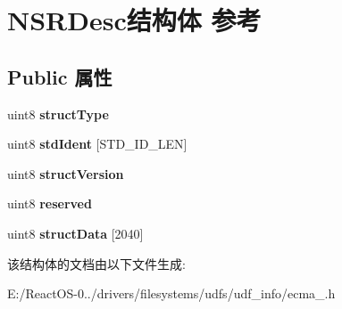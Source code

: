 \hypertarget{struct_n_s_r_desc}{}\section{N\+S\+R\+Desc结构体 参考}
\label{struct_n_s_r_desc}
\subsection*{Public 属性}
\begin{DoxyCompactItemize}
\item 
\mbox{\label{struct_n_s_r_desc_a459801c108c2eb1d6254430ad47ceb75}} 
uint8 {\bfseries struct\+Type}
\item 
\mbox{\label{struct_n_s_r_desc_a38ff52f92bb45870b1455de72e2acaa6}} 
uint8 {\bfseries std\+Ident} \mbox{[}S\+T\+D\+\_\+\+I\+D\+\_\+\+L\+EN\mbox{]}
\item 
\mbox{\label{struct_n_s_r_desc_a81368006929e2eee8e0b193a5d0cb8ec}} 
uint8 {\bfseries struct\+Version}
\item 
\mbox{\label{struct_n_s_r_desc_afa1b8b7983ad9ef8b2075fbb1c3c72bd}} 
uint8 {\bfseries reserved}
\item 
\mbox{\label{struct_n_s_r_desc_ae37bfd7cfe8bbd747072d95da14de8a7}} 
uint8 {\bfseries struct\+Data} \mbox{[}2040\mbox{]}
\end{DoxyCompactItemize}


该结构体的文档由以下文件生成\+:\begin{DoxyCompactItemize}
\item 
E\+:/\+React\+O\+S-\/0../drivers/filesystems/udfs/udf\+\_\+info/ecma\+\_.\+h\end{DoxyCompactItemize}
